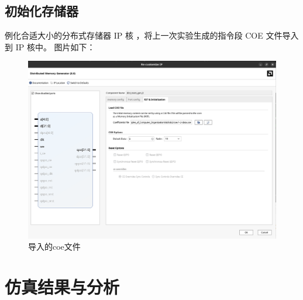 \documentclass[12pt,a4paper]{ctexart}
\begin{document}
\subsection{初始化存储器}
例化合适大小的分布式存储器 IP 核
，将上一次实验生成的指令段 COE 文件导入到 IP 核中。
图片如下：
\begin{center}
    \begin{figure}[h]
        \includegraphics[scale=0.38]{pic/2024-04-03_23-48.png}
        \caption{导入的coe文件}
    \end{figure}
\end{center}
\section{仿真结果与分析}
\end{document}
